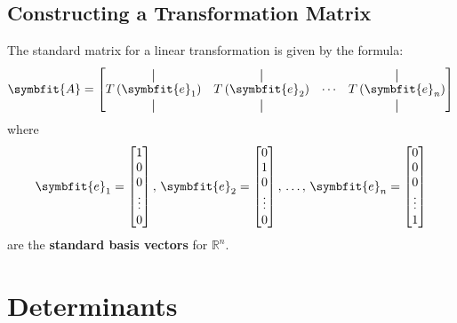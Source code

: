 \documentclass{article}
\begin{document}
\subsection{Constructing a Transformation Matrix}
\begin{theorem}
    The standard matrix for a linear transformation is given by the
    formula:
    \begin{equation*}
        \symbfit{A} =
        \begin{bmatrix}
            \vertbar                    & \vertbar                    &        & \vertbar                    \\
            T\left(\symbfit{e}_1\right) & T\left(\symbfit{e}_2\right) & \cdots & T\left(\symbfit{e}_n\right) \\
            \vertbar                    & \vertbar                    &        & \vertbar
        \end{bmatrix}
    \end{equation*}
    where
    \begin{equation*}
        \symbfit{e}_1 =
        \begin{bmatrix}
            1      \\
            0      \\
            0      \\
            \vdots \\
            0
        \end{bmatrix}
        ,\, \symbfit{e}_2 =
        \begin{bmatrix}
            0      \\
            1      \\
            0      \\
            \vdots \\
            0
        \end{bmatrix}
        ,\, \dots,\, \symbfit{e}_n =
        \begin{bmatrix}
            0      \\
            0      \\
            0      \\
            \vdots \\
            1
        \end{bmatrix}
    \end{equation*}
    are the \textbf{standard basis vectors} for \(\mathbb{R}^n\).
\end{theorem}
\newpage
\section{Determinants}
\end{document}
